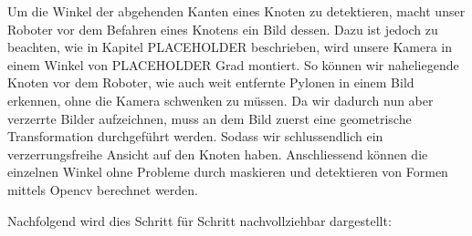 Um die Winkel der abgehenden Kanten eines Knoten zu detektieren, macht unser Roboter vor dem Befahren eines Knotens ein Bild dessen. Dazu ist jedoch zu beachten, wie in Kapitel PLACEHOLDER beschrieben, wird unsere Kamera in einem Winkel von PLACEHOLDER Grad montiert. So können wir naheliegende Knoten vor dem Roboter, wie auch weit entfernte Pylonen in einem Bild erkennen, ohne die Kamera schwenken zu müssen.
Da wir dadurch nun aber verzerrte Bilder aufzeichnen, muss an dem Bild zuerst eine geometrische Transformation durchgeführt werden. Sodass wir schlussendlich ein verzerrungsfreihe Ansicht auf den Knoten haben. Anschliessend können die einzelnen Winkel ohne Probleme durch maskieren und detektieren von Formen mittels Opencv berechnet werden.

Nachfolgend wird dies Schritt für Schritt nachvollziehbar dargestellt:

